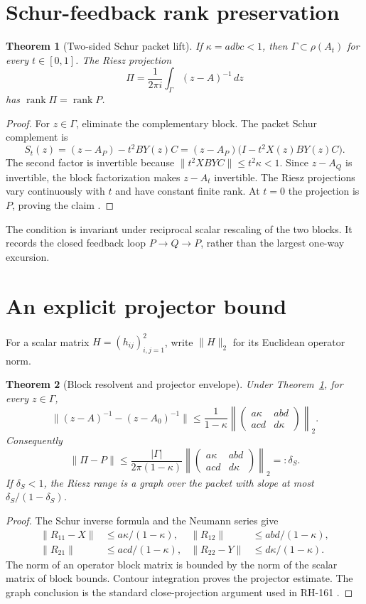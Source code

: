 \documentclass[12pt]{article}
\newtheorem{theorem}{Theorem}
\newcommand{\norm}[1]{\lVert#1\rVert}
\begin{document}
\section{Schur-feedback rank preservation}
\begin{theorem}[Two-sided Schur packet lift]\label{thm:schur}
If $\kappa=adbc<1$, then $\Gamma\subset\rho(A_t)$ for every $t\in[0,1]$.
The Riesz projection
\[
 \Pi=\frac{1}{2\pi i}\int_\Gamma(z-A)^{-1}\,dz
\]
has $\operatorname{rank}\Pi=\operatorname{rank}P$.
\end{theorem}
\begin{proof}
For $z\in\Gamma$, eliminate the complementary block.  The packet Schur
complement is
\[
 S_t(z)=(z-A_P)-t^2BY(z)C
       =(z-A_P)\bigl(I-t^2X(z)BY(z)C\bigr).
\]
The second factor is invertible because
$\norm{t^2XBYC}\le t^2\kappa<1$.  Since $z-A_Q$ is invertible, the block
factorization makes $z-A_t$ invertible.  The Riesz projections vary
continuously with $t$ and have constant finite rank.  At $t=0$ the projection
is $P$, proving the claim \citep{Kato1995}.
\end{proof}

The condition is invariant under reciprocal scalar rescaling of the two
blocks.  It records the closed feedback loop $P\to Q\to P$, rather than the
largest one-way excursion.

\section{An explicit projector bound}
For a scalar matrix $H=(h_{ij})_{i,j=1}^2$, write $\norm H_2$ for its
Euclidean operator norm.

\begin{theorem}[Block resolvent and projector envelope]\label{thm:bound}
Under Theorem~\ref{thm:schur}, for every $z\in\Gamma$,
\[
 \norm{(z-A)^{-1}-(z-A_0)^{-1}}
 \leq\frac1{1-\kappa}
 \left\|
 \begin{pmatrix}
 a\kappa&abd\\ acd&d\kappa
 \end{pmatrix}\right\|_2.
\]
Consequently
\[
 \norm{\Pi-P}\leq
 \frac{|\Gamma|}{2\pi(1-\kappa)}
 \left\|
 \begin{pmatrix}
 a\kappa&abd\\ acd&d\kappa
 \end{pmatrix}\right\|_2=:\delta_S.
\]
If $\delta_S<1$, the Riesz range is a graph over the packet with slope at
most $\delta_S/(1-\delta_S)$.
\end{theorem}
\begin{proof}
The Schur inverse formula and the Neumann series give
\begin{align*}
 \norm{R_{11}-X}&\le a\kappa/(1-\kappa),&
 \norm{R_{12}}&\le abd/(1-\kappa),\\
 \norm{R_{21}}&\le acd/(1-\kappa),&
 \norm{R_{22}-Y}&\le d\kappa/(1-\kappa).
\end{align*}
The norm of an operator block matrix is bounded by the norm of the scalar
matrix of block bounds.  Contour integration proves the projector estimate.
The graph conclusion is the standard close-projection argument used in
RH-161 \citep{WangRH161}.
\end{proof}
\end{document}
